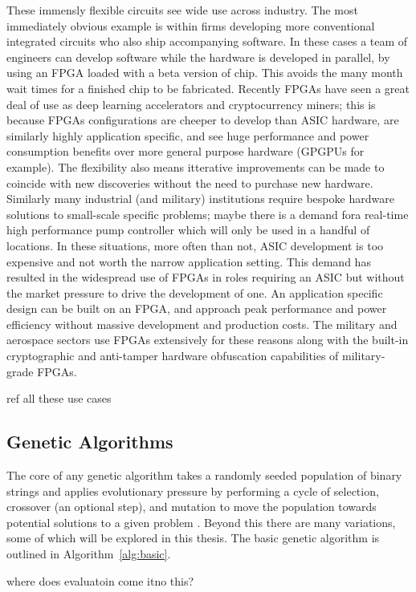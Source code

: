 These immensly flexible circuits see wide use across industry. The most immediately
obvious example is
within firms developing more conventional integrated circuits who also ship accompanying
software. In these cases a team of engineers can develop software
while the hardware is developed in parallel, by using an FPGA loaded with a beta version
of chip. This avoids the many month wait times for a finished chip to be fabricated.
Recently FPGAs have seen a great deal of use as deep learning accelerators and cryptocurrency
miners; this is because FPGAs
configurations are cheeper to develop than ASIC hardware, are similarly highly application specific,
and see huge performance and power consumption benefits over more general purpose
hardware (GPGPUs for example). The flexibility also means itterative improvements
can be made to coincide with new discoveries without the need to purchase new
hardware. Similarly many industrial (and military) institutions require
bespoke hardware solutions to small-scale specific problems; maybe there is a
demand fora real-time high performance
pump controller which will only be used in a handful of locations. In these situations,
more often than not, ASIC
development is too expensive and not worth the narrow application setting. This demand has resulted in
the widespread use of FPGAs
in roles requiring an ASIC but without the market pressure to drive the development
of one.
An application specific design can be built on an FPGA, and approach peak performance and power
efficiency without massive development and production costs.
The military and aerospace sectors use FPGAs extensively for these reasons along with
the built-in cryptographic and anti-tamper hardware obfuscation capabilities of
military-grade FPGAs.

\todo ref all these use cases

\subsection{Genetic Algorithms}
The core of any genetic algorithm takes a randomly seeded population of binary strings
and applies
evolutionary pressure by performing a cycle of selection, crossover (an optional
step), and mutation
to move the population towards potential solutions to a given problem \cite{Goldberg:1989:GAS:534133}.
Beyond this there are many
variations, some of which will be explored in this thesis. The basic genetic algorithm is
outlined in Algorithm~\ref{alg:basic}.

\todo where does evaluatoin come itno this?

